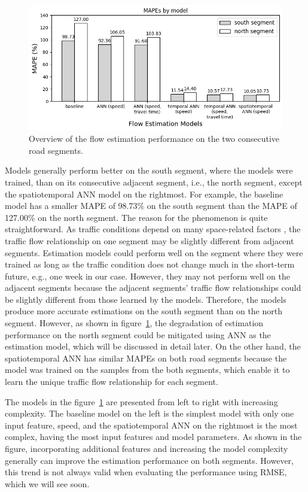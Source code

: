 \documentclass[english]{kththesis}
\begin{document}
\begin{figure}[!ht]
    \centering
    \includegraphics[width=\textwidth]{mape_histogram.png}
    \caption{Overview of the flow estimation performance on the two consecutive road segments.}
    \label{fig:mape_histogram}
\end{figure}

Models generally perform better on the south segment, where the models were trained, than on its consecutive adjacent segment, i.e., the north segment, except the spatiotemporal ANN model on the rightmost. For example, the baseline model has a smaller MAPE of 98.73\% on the south segment than the MAPE of 127.00\% on the north segment. The reason for the phenomenon is quite straightforward. As traffic conditions depend on many space-related factors \cite{seo_tse, wang_tse_online_calibration}, the traffic flow relationship on one segment may be slightly different from adjacent segments. Estimation models could perform well on the segment where they were trained as long as the traffic condition does not change much in the short-term future, e.g., one week in our case. However, they may not perform well on the adjacent segments because the adjacent segments' traffic flow relationships could be slightly different from those learned by the models. Therefore, the models produce more accurate estimations on the south segment than on the north segment. However, as shown in figure~\ref{fig:mape_histogram}, the degradation of estimation performance on the north segment could be mitigated using ANN as the estimation model, which will be discussed in detail later. On the other hand, the spatiotemporal ANN has similar MAPEs on both road segments because the model was trained on the samples from the both segments, which enable it to learn the unique traffic flow relationship for each segment.

The models in the figure~\ref{fig:mape_histogram} are presented from left to right with increasing complexity. The baseline model on the left is the simplest model with only one input feature, speed, and the spatiotemporal ANN on the rightmost is the most complex, having the most input features and model parameters. As shown in the figure, incorporating additional features and increasing the model complexity generally can improve the estimation performance on both segments. However, this trend is not always valid when evaluating the performance using RMSE, which we will see soon.
\end{document}
